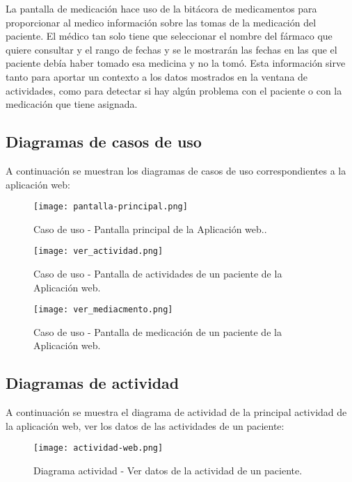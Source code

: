 \documentclass[11pt,spanish]{article}
\begin{document}
La pantalla de medicación hace uso de la bitácora de medicamentos para proporcionar al medico información sobre las tomas de la medicación del paciente. El médico tan solo tiene que seleccionar el nombre del fármaco que quiere consultar y el rango de fechas y se le mostrarán las fechas en las que el paciente debía haber tomado esa medicina y no la tomó. Esta información sirve tanto para aportar un contexto a los datos mostrados en la ventana de actividades, como para detectar si hay algún problema con el paciente o con la medicación que tiene asignada.
\newpage

\subsection{Diagramas de casos de uso}

A continuación se muestran los diagramas de casos de uso correspondientes a la aplicación web:
\newline

\begin{figure}[H]
  \centering
  \texttt{[image: pantalla-principal.png]}
  \caption{Caso de uso - Pantalla principal de la Aplicación web..}
\end{figure}

\begin{figure}[H]
  \centering
  \texttt{[image: ver\_actividad.png]}
  \caption{Caso de uso - Pantalla de actividades de un paciente de la Aplicación web.}
\end{figure}

\begin{figure}[H]
  \centering
  \texttt{[image: ver\_mediacmento.png]}
  \caption{Caso de uso - Pantalla de medicación de un paciente de la Aplicación web.}
\end{figure}


\subsection{Diagramas de actividad}
A continuación se muestra el diagrama de actividad de la principal actividad de la aplicación web, ver los datos de las actividades de un paciente:

\begin{figure}[H]
  \centering
  \texttt{[image: actividad-web.png]}
  \caption{Diagrama actividad - Ver datos de la actividad de un paciente.}
\end{figure}
\end{document}
